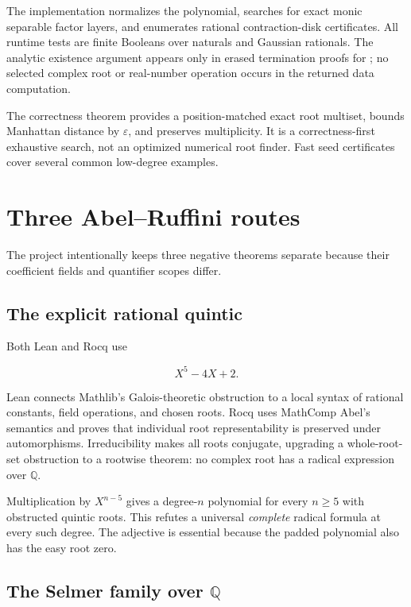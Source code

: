 \documentclass[
  10pt,
  a4paper,
  twoside,
  open=any,
  parskip=half,
  headings=big
]{scrreprt}
\newcommand{\code}[1]{\texttt{\detokenize{#1}}}
\begin{document}
The implementation normalizes the polynomial, searches for exact monic separable factor layers, and enumerates rational contraction-disk certificates. All runtime tests are finite Booleans over naturals and Gaussian rationals. The analytic existence argument appears only in erased termination proofs for \code{Nat.find}; no selected complex root or real-number operation occurs in the returned data computation.

The correctness theorem provides a position-matched exact root multiset, bounds Manhattan distance by \(\varepsilon\), and preserves multiplicity. It is a correctness-first exhaustive search, not an optimized numerical root finder. Fast seed certificates cover several common low-degree examples.

\section{Three Abel--Ruffini routes}

The project intentionally keeps three negative theorems separate because their coefficient fields and quantifier scopes differ.

\subsection{The explicit rational quintic}

Both Lean and Rocq use

\[
X^5-4X+2.
\]

Lean connects Mathlib's Galois-theoretic obstruction to a local syntax of rational constants, field operations, and chosen roots. Rocq uses MathComp Abel's \code{algterm} semantics and proves that individual root representability is preserved under automorphisms. Irreducibility makes all roots conjugate, upgrading a whole-root-set obstruction to a rootwise theorem: no complex root has a radical expression over \(\mathbb Q\).

Multiplication by \(X^{n-5}\) gives a degree-\(n\) polynomial for every \(n\ge5\) with obstructed quintic roots. This refutes a universal \emph{complete} radical formula at every such degree. The adjective is essential because the padded polynomial also has the easy root zero.

\subsection[The Selmer family over Q]{The Selmer family over \(\mathbb Q\)}
\end{document}
